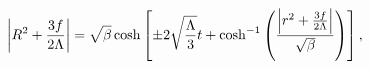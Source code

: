 \begin{equation}
\left|{R^2}+{{3f}\over{2\Lambda}}\right|=\sqrt{\beta}\cosh\left[\pm 2
\sqrt{{\Lambda\over{3}}}t+{\cosh^{-1}}\left(
{{\left|{r^2}+{{3f}\over{2\Lambda}}\right|}
\over{\sqrt{\beta}}}\right)\right],\label{sol1}
\end{equation}

